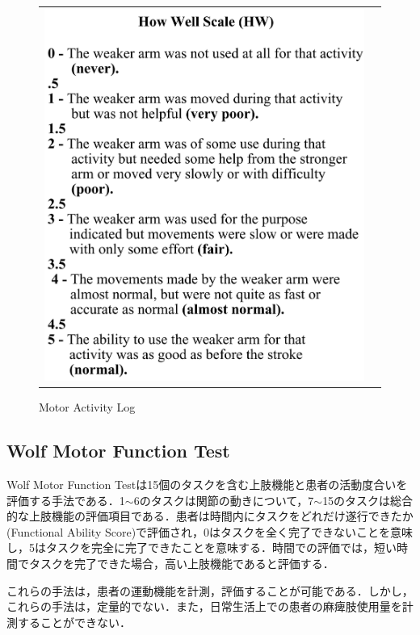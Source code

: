 \begin{figure}[H]
\begin{center}
\begin{tabular}{cc}
{\includegraphics[scale=0.3]{fig/ch1/how}
} \\
\end{tabular}
\end{center}
   \caption{Motor Activity Log}
\label{fig:Motor Activity Log}
\end{figure}

\subsection*{Wolf Motor Function Test}
Wolf Motor Function Testは15個のタスクを含む上肢機能と患者の活動度合いを評価する手法である．1$\sim$6のタスクは関節の動きについて，7$\sim$15のタスクは総合的な上肢機能の評価項目である．患者は時間内にタスクをどれだけ遂行できたか(Functional Ability Score)で評価され，0はタスクを全く完了できないことを意味し，5はタスクを完全に完了できたことを意味する．時間での評価では，短い時間でタスクを完了できた場合，高い上肢機能であると評価する．

これらの手法は，患者の運動機能を計測，評価することが可能である．しかし，これらの手法は，定量的でない．また，日常生活上での患者の麻痺肢使用量を計測することができない．



